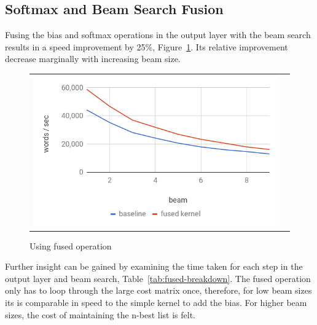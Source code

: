 \documentclass[11pt,a4paper]{article}
\begin{document}
\subsection{Softmax and Beam Search Fusion}

Fusing the bias and softmax operations in the output layer with the beam search results in a speed improvement by 25\%, Figure~\ref{fig:fused}. Its relative improvement decrease marginally with increasing beam size.

\begin{figure}[ht]
\centering
\begin{tabular}{cc}
{\includegraphics[scale=0.3]{fused.png}} 
\end{tabular}
\caption{Using fused operation}
\label{fig:fused}
\end{figure} 

Further insight can be gained by examining the time taken for each step in the output layer and beam search, Table~\ref{tab:fused-breakdown}. The fused operation only has to loop through the large cost matrix once, therefore, for low beam sizes its is comparable in speed to the simple kernel to add the bias. For higher beam sizes, the cost of maintaining the n-best list is felt.
\end{document}
